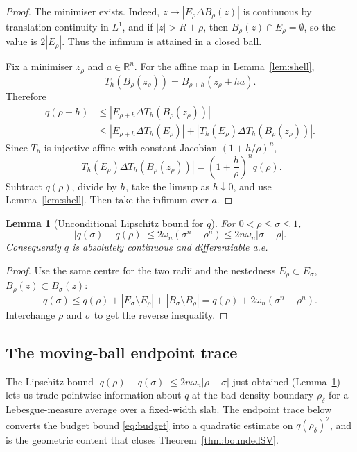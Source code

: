 \documentclass[11pt]{amsart}
\newtheorem{lemma}[theorem]{Lemma}
\theoremstyle{definition}
\newcommand{\R}{\mathbb R}
\newcommand{\rdel}{\rho_\delta}
\begin{document}
\begin{proof}
The minimiser exists.  Indeed, \(z\mapsto |E_\rho\Delta B_\rho(z)|\) is
continuous by translation continuity in \(L^1\), and if
\(|z|>R+\rho\), then \(B_\rho(z)\cap E_\rho=\emptyset\), so the value is
\(2|E_\rho|\).  Thus the infimum is attained in a closed ball.

Fix a minimiser \(z_\rho\) and \(a\in\R^n\).  For the affine map in
Lemma~\ref{lem:shell},
\[
   T_h(B_\rho(z_\rho))=B_{\rho+h}(z_\rho+ha).
\]
Therefore
\[
\begin{aligned}
   q(\rho+h)
   &\le |E_{\rho+h}\Delta T_h(B_\rho(z_\rho))|\\
   &\le |E_{\rho+h}\Delta T_h(E_\rho)|
      +|T_h(E_\rho)\Delta T_h(B_\rho(z_\rho))|.
\end{aligned}
\]
Since \(T_h\) is injective affine with constant Jacobian
\((1+h/\rho)^n\),
\[
   |T_h(E_\rho)\Delta T_h(B_\rho(z_\rho))|
   =
   \left(1+\frac h\rho\right)^n q(\rho).
\]
Subtract \(q(\rho)\), divide by \(h\), take the limsup as \(h\downarrow0\),
and use Lemma~\ref{lem:shell}.  Then take the infimum over \(a\).
\end{proof}

\begin{lemma}[Unconditional Lipschitz bound for \(q\)]\label{lem:qLip}
For \(0<\rho\le\sigma\le1\),
\[
   |q(\sigma)-q(\rho)|
   \le 2\omega_n(\sigma^n-\rho^n)
   \le 2n\omega_n|\sigma-\rho|.
\]
Consequently \(q\) is absolutely continuous and differentiable a.e.
\end{lemma}

\begin{proof}
Use the same centre for the two radii and the nestedness
\(E_\rho\subset E_\sigma\), \(B_\rho(z)\subset B_\sigma(z)\):
\[
   q(\sigma)\le q(\rho)+|E_\sigma\setminus E_\rho|
                         +|B_\sigma\setminus B_\rho|
   =q(\rho)+2\omega_n(\sigma^n-\rho^n).
\]
Interchange \(\rho\) and \(\sigma\) to get the reverse inequality.
\end{proof}

\subsection{The moving-ball endpoint trace}\label{sec:part-endpoint}\label{sec:endpoint}

The Lipschitz bound \(|q(\rho)-q(\sigma)|\le 2n\omega_n|\rho-\sigma|\)
just obtained (Lemma~\ref{lem:qLip}) lets us trade pointwise information
about \(q\) at the bad-density boundary \(\rdel\) for a Lebesgue-measure
average over a fixed-width slab.  The endpoint trace below converts the
budget bound \eqref{eq:budget} into a quadratic estimate on
\(q(\rdel)^2\), and is the geometric content that closes
Theorem~\ref{thm:boundedSV}.
\end{document}

